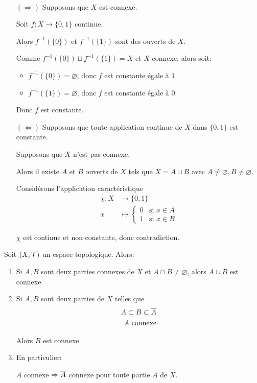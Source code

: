\documentclass[french,a4paper,10pt]{article}
\begin{document}
	\begin{myproof}\,
		\begin{itemize}
			\item[$(\Rightarrow)$] Supposons que $X$ est connexe.

			Soit $f\colon X\to\{0,1\}$ continue.

			Alors $f^{-1}(\{0\})$ et $f^{-1}(\{1\})$ sont des ouverts de $X$.

			Comme $f^{-1}(\{0\})\sqcup f^{-1}(\{1\})=X$ et $X$ connexe, alors soit:
			\begin{itemize}
				\item $f^{-1}(\{0\})=\varnothing$, donc $f$ est constante égale à $1$.
				\item $f^{-1}(\{1\})=\varnothing$, donc $f$ est constante égale à $0$.
			\end{itemize}

			Donc $f$ est constante.

			\item[$(\Leftarrow)$] Supposons que toute application continue de $X$ dans $\{0,1\}$ est constante.

			Supposons que $X$ n'est pas connexe.

			Alors il existe $A$ et $B$ ouverts de $X$ tels que $X=A\sqcup B$ avec $A\ne\varnothing, B\ne\varnothing$.

			Considérons l'application caractéristique
			\[\begin{aligned}
				\chi\colon X &\to \{0,1\}\\
				x &\mapsto \begin{cases}
					0 & \text{si } x\in A\\
					1 & \text{si } x\in B
				\end{cases}
			\end{aligned}\]
			
			$\chi$ est continue et non constante, donc contradiction.
		\end{itemize}
	\end{myproof}

	\begin{proposition}
		Soit $(X,\cal T)$ un espace topologique. Alors:
		\begin{enumerate}[label=\arabic*)]
			\item Si $A,B$ sont deux parties connexes de $X$ et $A\cap B\ne\varnothing$, alors $A\cup B$ est connexe.
			\item Si $A,B$ sont deux parties de $X$ telles que
			\[\begin{aligned}
				A\subset B\subset \overline{A}\\
				A\text{ connexe}
			\end{aligned}\]

			Alors $B$ est connexe.

			\item En particulier:

			$A$ connexe $\Rightarrow \overline{A}$ connexe pour toute partie $A$ de $X$.
		\end{enumerate}

	\end{proposition}
\end{document}
